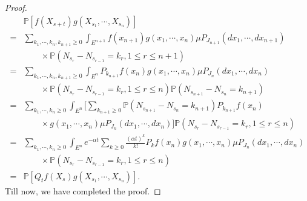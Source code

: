 \documentclass[12pt]{article}
\renewcommand{\(}{\left(}%
\renewcommand{\)}{\right)}%
\renewcommand{\[}{\left[}%
\renewcommand{\]}{\right]}%
\newcommand{\p}{\mathbb{P}}
\newtheorem{proof}{Proof.}}
\begin{document}
\begin{proof}
\begin{align*}
  		&\p[f(X_{s+t})g(X_{s_1},\cdots,X_{s_n})]\\
  			=&\sum_{k_1,\cdots,k_n,k_{n+1}\geq 0}\int_{E^{n+1}}f(x_{n+1})g(x_1,\cdots,x_n)\mu P_{J_{n+1}}(dx_1,\cdots,dx_{n+1})\\
  			&\qquad\times \p(N_{s_r}-N_{s_{r-1}}=k_r,1\leq r\leq n+1)\\
  			=&\sum_{k_1,\cdots,k_n,k_{n+1}\geq 0}\int_{E^{n}}P_{k_{n+1}}f(x_{n})g(x_1,\cdots,x_n)\mu P_{J_n}(dx_1,\cdots,dx_n)\\
  			&\qquad\times \p(N_{s_r}-N_{s_{r-1}}=k_r,1\leq r\leq n)\p(N_{s_{n+1}}-N_{s_{n}}=k_{n+1})\\
  			=&\sum_{k_1,\cdots,k_n\geq 0}\int_{E^{n}}\bigg[\sum_{k_{n+1}\geq 0}\p(N_{s_{n+1}}-N_{s_{n}}=k_{n+1})P_{k_{n+1}}f(x_{n})\\
  			&\qquad\times g(x_1,\cdots,x_n)\mu P_{J_n}(dx_1,\cdots,dx_n)\bigg]\p(N_{s_r}-N_{s_{r-1}}=k_r,1\leq r\leq n)\\
  			=&\sum_{k_1,\cdots,k_n\geq 0}\int_{E^{n}}e^{-\alpha t} \sum_{k\geq 0}\frac{(\alpha t)^{k}}{k!} P_{k}f(x_{n})g(x_1,\cdots,x_n)\mu P_{J_n}(dx_1,\cdots,dx_n)\\
  			&\qquad\times \p(N_{s_r}-N_{s_{r-1}}=k_r,1\leq r\leq n)\\
  			=&\p[Q_tf(X_s)g(X_{s_1},\cdots,X_{s_n})].
  	\end{align*}
  	Till now, we have completed the proof.
  \end{proof}
  
\end{document}
